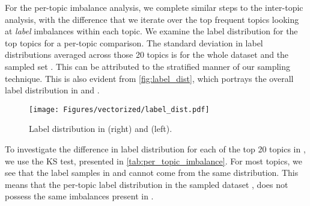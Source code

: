 \documentclass[11pt]{article}
\begin{document}
For the per-topic imbalance analysis, we complete similar steps to the inter-topic analysis, with the difference that we iterate over the top  frequent topics looking at \emph{label} imbalances within each topic. We examine the label distribution for the top  topics for a per-topic comparison. The standard deviation in label distributions averaged across those 20 topics is  for the whole dataset  and the sampled set  . This can be attributed to the stratified manner of our sampling technique. This is also evident from \autoref{fig:label_dist}, which portrays the overall label distribution in  and . 

\begin{figure}
\centering
\texttt{[image: Figures/vectorized/label\_dist.pdf]}
\caption{Label distribution in  (right) and  (left).}
\label{fig:label_dist}
\end{figure}

To investigate the difference in label distribution for each of the top 20 topics in , we use the KS test, presented in \autoref{tab:per_topic_imbalance}. For most topics, we see that the label samples in  and  cannot come from the same distribution. This means that the per-topic label distribution in the sampled dataset , does not possess the same imbalances present in .
\end{document}

